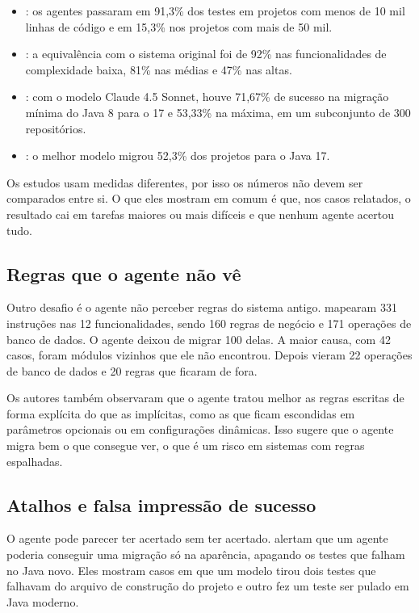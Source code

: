 \begin{itemize}
    \item {}: os agentes passaram em 91,3\% dos testes em projetos com menos de 10 mil linhas de código e em 15,3\% nos projetos com mais de 50 mil.
    \item {}: a equivalência com o sistema original foi de 92\% nas funcionalidades de complexidade baixa, 81\% nas médias e 47\% nas altas.
    \item {}: com o modelo Claude 4.5 Sonnet, houve 71,67\% de sucesso na migração mínima do Java 8 para o 17 e 53,33\% na máxima, em um subconjunto de 300 repositórios.
    \item {}: o melhor modelo migrou 52,3\% dos projetos para o Java 17.
\end{itemize}

Os estudos usam medidas diferentes, por isso os números não devem ser comparados entre si. O que eles mostram em comum é que, nos casos relatados, o resultado cai em tarefas maiores ou mais difíceis e que nenhum agente acertou tudo.

\subsection*{Regras que o agente não vê}

Outro desafio é o agente não perceber regras do sistema antigo.  mapearam 331 instruções nas 12 funcionalidades, sendo 160 regras de negócio e 171 operações de banco de dados. O agente deixou de migrar 100 delas. A maior causa, com 42 casos, foram módulos vizinhos que ele não encontrou. Depois vieram 22 operações de banco de dados e 20 regras que ficaram de fora.

Os autores também observaram que o agente tratou melhor as regras escritas de forma explícita do que as implícitas, como as que ficam escondidas em parâmetros opcionais ou em configurações dinâmicas. Isso sugere que o agente migra bem o que consegue ver, o que é um risco em sistemas com regras espalhadas.

\subsection*{Atalhos e falsa impressão de sucesso}

O agente pode parecer ter acertado sem ter acertado.  alertam que um agente poderia conseguir uma migração só na aparência, apagando os testes que falham no Java novo. Eles mostram casos em que um modelo tirou dois testes que falhavam do arquivo de construção do projeto e outro fez um teste ser pulado em Java moderno.


